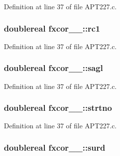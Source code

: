 Definition at line 37 of file A\+P\+T227.\+c.

\subsubsection[{\texorpdfstring{rc1}{rc1}}]{\setlength{\rightskip}{0pt plus 5cm}doublereal fxcor\+\_\+\_\+\+::rc1}\hypertarget{structfxcor__1___a956da884deb454126eceaf8b4c904767}{}\label{structfxcor__1___a956da884deb454126eceaf8b4c904767}


Definition at line 37 of file A\+P\+T227.\+c.

\subsubsection[{\texorpdfstring{sagl}{sagl}}]{\setlength{\rightskip}{0pt plus 5cm}doublereal fxcor\+\_\+\_\+\+::sagl}\hypertarget{structfxcor__1___ae505051937663fdfeb4f4852c1deca81}{}\label{structfxcor__1___ae505051937663fdfeb4f4852c1deca81}


Definition at line 37 of file A\+P\+T227.\+c.

\subsubsection[{\texorpdfstring{strtno}{strtno}}]{\setlength{\rightskip}{0pt plus 5cm}doublereal fxcor\+\_\+\_\+\+::strtno}\hypertarget{structfxcor__1___a022242eb0fff221e9dc2fe4d1dde1259}{}\label{structfxcor__1___a022242eb0fff221e9dc2fe4d1dde1259}


Definition at line 37 of file A\+P\+T227.\+c.

\subsubsection[{\texorpdfstring{surd}{surd}}]{\setlength{\rightskip}{0pt plus 5cm}doublereal fxcor\+\_\+\_\+\+::surd}\hypertarget{structfxcor__1___afc250ed2c82b0d1f17502736a3c9c0ac}{}\label{structfxcor__1___afc250ed2c82b0d1f17502736a3c9c0ac}


